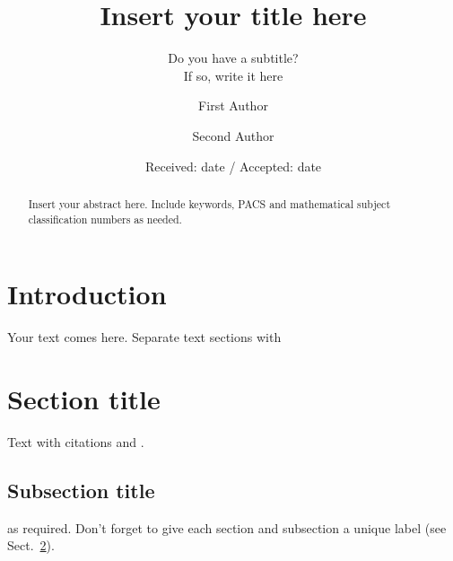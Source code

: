 \documentclass{svjour3}                     %
\begin{document}
\title{Insert your title here%
}
\subtitle{Do you have a subtitle?\\ If so, write it here}


\author{First Author         \and
        Second Author %
}



\date{Received: date / Accepted: date}


\maketitle

\begin{abstract}
Insert your abstract here. Include keywords, PACS and mathematical
subject classification numbers as needed.
\end{abstract}

\section{Introduction}
\label{intro}
Your text comes here. Separate text sections with
\section{Section title}
\label{sec:1}
Text with citations \cite{RefB} and \cite{RefJ}.
\subsection{Subsection title}
\label{sec:2}
as required. Don't forget to give each section
and subsection a unique label (see Sect.~\ref{sec:1}).
\end{document}
